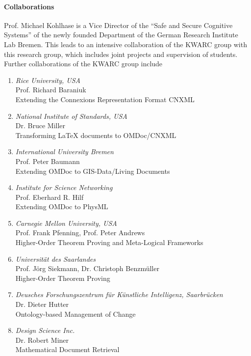 \paragraph{Collaborations}
Prof. Michael Kohlhase is a Vice Director of the ``Safe and Secure Cognitive Systems'' of
the newly founded Department of the German Research Institute Lab Bremen. This leads to an
intensive collaboration of the KWARC group with this research group, which includes joint
projects and supervision of students. Further collaborations of the KWARC group include
\begin{enumerate}
    \item {\sl Rice University, USA}\\
          Prof. Richard Baraniuk\\
          Extending the Connexions Representation Format CNXML
    \item {\sl National Institute of Standards, USA}\\
          Dr. Bruce Miller\\
          Transforming {\LaTeX} documents to OMDoc/CNXML
    \item {\sl International University Bremen}\\
          Prof. Peter Baumann\\
          Extending OMDoc to GIS-Data/Living Documents
    \item {\sl Institute for Science Networking}\\
          Prof. Eberhard R. Hilf\\
          Extending OMDoc to PhysML
    \item {\sl Carnegie Mellon University, USA}\\
          Prof. Frank Pfenning, Prof. Peter Andrews\\
          Higher-Order Theorem Proving and Meta-Logical Frameworks
    \item {\sl Universit\"at des Saarlandes}\\
          Prof. J\"org Siekmann, Dr. Christoph Benzm\"uller\\
          Higher-Order Theorem Proving
    \item {\sl Deusches Forschungszentrum f\"ur K\"unstliche Intelligenz, Saarbr\"ucken}\\
          Dr. Dieter Hutter\\
          Ontology-based Management of Change
    \item {\sl Design Science Inc.}\\
          Dr. Robert Miner\\
          Mathematical Document Retrieval
\end{enumerate}

